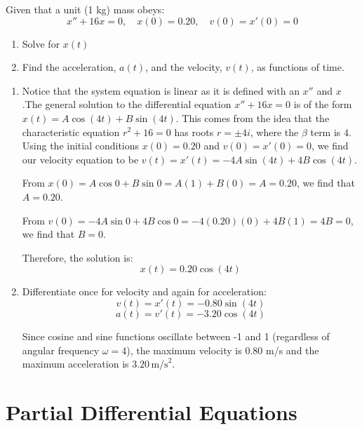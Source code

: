 \begin{Exercise}
	[title={Linear Systems 3}, label={ex:diff_eq3}]

	Given that a unit (1 kg) mass obeys:
	\[
		x''+16x=0,\quad x(0)=0.20,\quad v(0)=x'(0)=0
	\]

	\begin{enumerate}
		\item Solve for $x(t)$

		\item Find the acceleration, $a(t)$, and the velocity, $v(t)$, as functions of
			time.
	\end{enumerate}
\end{Exercise}
\begin{Answer}
	[ref={ex:diff_eq3}]
	\begin{enumerate}
		\item Notice that the system equation is linear as it is defined with an $x''$
			and $x$.The general solution to the differential equation $x'' + 16x = 0$ is
			of the form $x(t) = A\cos(4t) + B\sin(4t)$. This comes from the idea that
			the characteristic equation $r^{2}+ 16 = 0$ has roots $r = \pm 4i$, where the
			$\beta$ term is $4$. Using the initial conditions $x(0) = 0.20$ and
			$v(0) = x'(0) = 0$, we find our velocity equation to be $v(t)=x'(t)=-4A\sin
			(4t)+4B\cos(4t)$.

			From $x(0)=A\cos 0 + B\sin 0 = A(1)+B(0)=A=0.20$, we find that $A=0.20$.

			From $v(0)=-4A\sin 0 + 4B\cos 0 = -4(0.20)(0)+4B(1)=4B=0$, we find that $B=
			0$.

			Therefore, the solution is:
			\[
				x(t) = 0.20\cos(4t)
			\]

		\item Differentiate once for velocity and again for acceleration:
			\[
				v(t) = x'(t) = -0.80\sin(4t)
			\]
			\[
				a(t) = v'(t) = -3.20\cos(4t)
			\]

			Since cosine and sine functions oscillate between -1 and 1 (regardless of
			angular frequency $\omega = 4$), the maximum velocity is $0.80$ m/s and
			the maximum acceleration is $3.20 \, \textrm{m/s}^{2}$.
	\end{enumerate}
\end{Answer}

\section{Partial Differential Equations}

